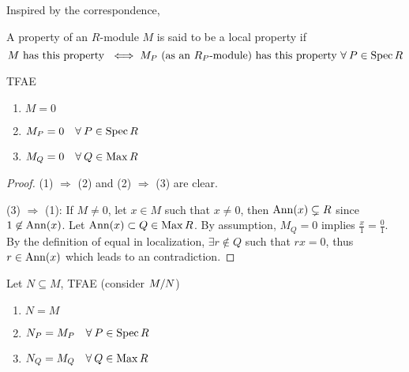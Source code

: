 \begin{remark}
  Inspired by the correspondence,
\end{remark}

\begin{definition}
  A property of an $R$-module $M$ is said to be a local property if
  \[
    M \text{ has this property } \iff M_P
    \text{ (as an $R_P$-module) has this property } \forall P \in \Spec R
  \]
\end{definition}

\begin{prop} \label{prop:module-is-zero-iff-zero-in-localization}
  TFAE
  \begin{enumerate}[(1)]
    \item $M = 0$
    \item $M_P = 0 \quad \forall P \in \Spec R$
    \item $M_Q = 0 \quad \forall Q \in \Max R$
  \end{enumerate}
  \begin{proof}
    (1) $\Rightarrow$ (2) and (2) $\Rightarrow$ (3) are clear.

    (3) $\Rightarrow$ (1):
    If $M \neq 0$, let $x \in M$ such that $x \neq 0$,
    then $\operatorname{Ann}(x) \subsetneq R$ since $1 \not\in \operatorname{Ann}(x)$.
    Let $\operatorname{Ann}(x) \subset Q \in \operatorname{Max} R$.
    By assumption, $M_Q = 0$ implies $\frac{x}{1} = \frac{0}{1}$.
    By the definition of equal in localization, $\exists r \not\in Q$
    such that $rx = 0$, thus $r \in \operatorname{Ann}(x)$ which leads to an contradiction.
  \end{proof}
\end{prop}

\begin{coro}
  Let $N \subseteq M$, TFAE (consider ${M}/{N}$)
  \begin{enumerate}[(1)]
    \item $N = M$
    \item $N_P = M_P \quad \forall P \in \Spec R$
    \item $N_Q = M_Q \quad \forall Q \in \Max R$
  \end{enumerate}
\end{coro}

